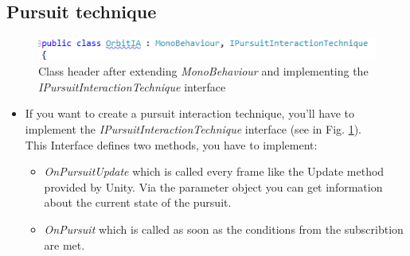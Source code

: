 \documentclass[../../Instructions_Framework]{subfiles}
\begin{document}
\subsection{Pursuit technique}
\begin{figure}
	\centering
	\includegraphics[width=0.7\linewidth]{img/InterfacePur}
	\caption{Class header after extending \textit{MonoBehaviour} and implementing the \textit{IPursuitInteractionTechnique} interface}
	\label{fig:interfacepur}
\end{figure}
\begin{itemize}
	\item If you want to create a pursuit interaction technique, you'll have to implement the \textit{IPursuitInteractionTechnique} interface (see in Fig. \ref{fig:interfacepur}).\\
	This Interface defines two methods, you have to implement:
	\begin{itemize}
		\item \textit{OnPursuitUpdate} which is called every frame like the Update method provided by Unity. Via the parameter object you can get information about the current state of the pursuit.
		\item \textit{OnPursuit} which is called as soon as the conditions from the subscribtion are met.
	\end{itemize}
\end{itemize}
\end{document}
